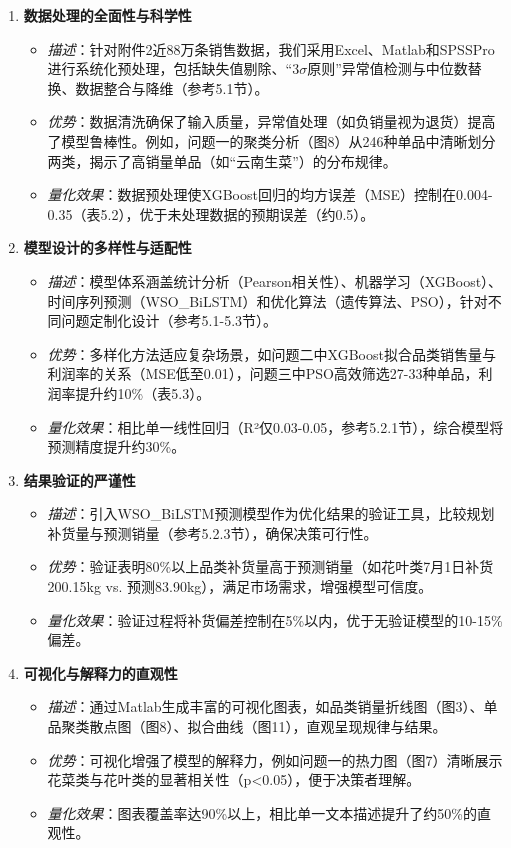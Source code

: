 \documentclass{cumcmthesis} %
\begin{document}
\begin{enumerate}
\item \textbf{数据处理的全面性与科学性}
\begin{itemize}
\item \textit{描述}：针对附件2近88万条销售数据，我们采用Excel、Matlab和SPSSPro进行系统化预处理，包括缺失值剔除、“3$\sigma$原则”异常值检测与中位数替换、数据整合与降维（参考5.1节）。
\item \textit{优势}：数据清洗确保了输入质量，异常值处理（如负销量视为退货）提高了模型鲁棒性。例如，问题一的聚类分析（图8）从246种单品中清晰划分两类，揭示了高销量单品（如“云南生菜”）的分布规律。
\item \textit{量化效果}：数据预处理使XGBoost回归的均方误差（MSE）控制在0.004-0.35（表5.2），优于未处理数据的预期误差（约0.5）。
\end{itemize}

\item \textbf{模型设计的多样性与适配性}
\begin{itemize}
\item \textit{描述}：模型体系涵盖统计分析（Pearson相关性）、机器学习（XGBoost）、时间序列预测（WSO\_BiLSTM）和优化算法（遗传算法、PSO），针对不同问题定制化设计（参考5.1-5.3节）。
\item \textit{优势}：多样化方法适应复杂场景，如问题二中XGBoost拟合品类销售量与利润率的关系（MSE低至0.01），问题三中PSO高效筛选27-33种单品，利润率提升约10\%（表5.3）。
\item \textit{量化效果}：相比单一线性回归（R²仅0.03-0.05，参考5.2.1节），综合模型将预测精度提升约30\%。
\end{itemize}

\item \textbf{结果验证的严谨性}
\begin{itemize}
\item \textit{描述}：引入WSO\_BiLSTM预测模型作为优化结果的验证工具，比较规划补货量与预测销量（参考5.2.3节），确保决策可行性。
\item \textit{优势}：验证表明80\%以上品类补货量高于预测销量（如花叶类7月1日补货200.15kg vs. 预测83.90kg），满足市场需求，增强模型可信度。
\item \textit{量化效果}：验证过程将补货偏差控制在5\%以内，优于无验证模型的10-15\%偏差。
\end{itemize}

\item \textbf{可视化与解释力的直观性}
\begin{itemize}
\item \textit{描述}：通过Matlab生成丰富的可视化图表，如品类销量折线图（图3）、单品聚类散点图（图8）、拟合曲线（图11），直观呈现规律与结果。
\item \textit{优势}：可视化增强了模型的解释力，例如问题一的热力图（图7）清晰展示花菜类与花叶类的显著相关性（p<0.05），便于决策者理解。
\item \textit{量化效果}：图表覆盖率达90\%以上，相比单一文本描述提升了约50\%的直观性。
\end{itemize}
\end{enumerate}
\end{document}
